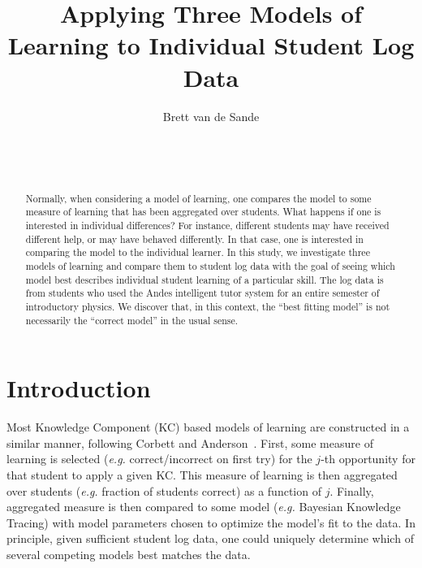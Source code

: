 \documentclass{edm_template}
\begin{document}
\title{Applying Three Models of Learning to Individual Student Log Data}
\author{
\alignauthor
      Brett van de Sande\\
       \\
       \\
       \\
}

\maketitle

\begin{abstract}
Normally, when considering a model of learning, one compares the model
to some measure of learning that has been aggregated over students.
What happens if one is interested in individual differences?  For
instance, different students may have received different help, or may
have behaved differently.  In that case, one is interested in
comparing the model to the individual learner.  In this study, we
investigate three models of learning and compare them to student log
data with the goal of seeing which model best describes individual
student learning of a particular skill.  The log data is from students
who used the Andes intelligent tutor system for an entire semester of
introductory physics.  We discover that, in this context, the ``best
fitting model'' is not necessarily the ``correct model'' in the usual
sense.
\end{abstract}



\section{Introduction}


Most Knowledge Component (KC) \cite{vanlehn_behavior_2006}
based models of learning are constructed
in a similar manner, following Corbett and Anderson~\citeyear{corbett_knowledge_1995}.
First, some measure of learning is selected ({\em e.g.} correct/incorrect
on first try) for the $j$-th opportunity for that student to apply a given KC.  
This measure of learning is then aggregated over students 
({\em e.g.} fraction of students correct) as a function of $j$.
Finally, aggregated measure is then compared to some model
({\em e.g.} Bayesian Knowledge Tracing) with model parameters
chosen to optimize the model's fit to the data.
In principle, given sufficient student log data, one could uniquely
determine which of several competing models best matches the
data.
\end{document}
